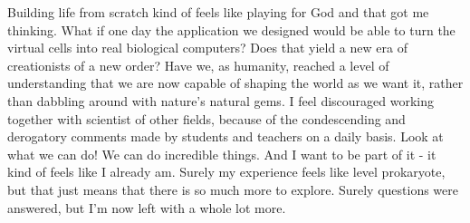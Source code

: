 Building life from scratch kind of feels like playing for God and that got me thinking. What if one day the application we designed would be able to turn the virtual cells into real biological computers? Does that yield a new era of creationists of a new order? Have we, as humanity, reached a level of understanding that we are now capable of shaping the world as we want it, rather than dabbling around with nature's natural gems. I feel discouraged working together with scientist of other fields, because of the condescending and derogatory comments made by students and teachers on a daily basis. Look at what we can do! We can do incredible things. And I want to be part of it - it kind of feels like I already am. Surely my experience feels like level prokaryote, but that just means that there is so much more to explore. Surely questions were answered, but I'm now left with a whole lot more.
